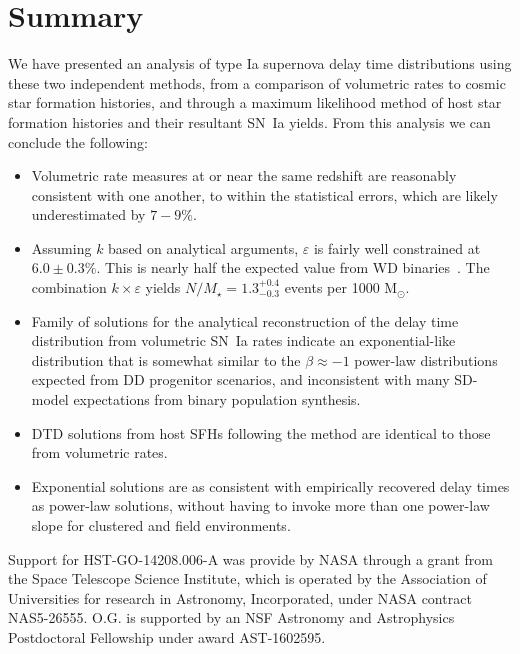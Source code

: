 \documentclass[apj, linenumbers]{aastex62}
\begin{document}
\section{Summary}
We have presented an analysis of type Ia supernova delay time distributions using these two independent methods, from a comparison of volumetric  rates to cosmic star formation histories, and through a maximum likelihood method of host star formation histories and their resultant SN~Ia yields. From this analysis we can conclude the following:
\begin{itemize}
	\item Volumetric rate measures at or near the same redshift are reasonably consistent with one another, to within the statistical errors, which are likely underestimated by $7-9\%$.
	\item  Assuming $k$ based on analytical arguments, $\varepsilon$ is fairly well constrained at $6.0\pm0.3\%$. This is nearly half the expected value from WD binaries~\citep{Maoz:2017zl}. The combination $k\times\varepsilon$ yields $N/M_\star=1.3^{+0.4}_{-0.3}$ events per 1000 M$_{\odot}$.
	\item Family of solutions for the analytical reconstruction of the delay time distribution from volumetric SN~Ia rates indicate an exponential-like distribution that is somewhat similar to the $\beta\approx-1$ power-law distributions expected from DD progenitor scenarios, and inconsistent with many SD-model expectations from binary population synthesis. 
	\item DTD solutions from host SFHs following the \cite{Maoz:2011} method are identical to those from volumetric rates. 
	\item Exponential solutions are as consistent with empirically recovered delay times as power-law solutions, without having to invoke more than one power-law slope for clustered and field environments.
\end{itemize}

\acknowledgments Support for HST-GO-14208.006-A was provide by NASA through a grant from the Space Telescope Science Institute, which is operated by the Association of Universities for research in Astronomy, Incorporated, under NASA contract NAS5-26555. O.G. is supported by an NSF Astronomy and Astrophysics Postdoctoral Fellowship under award AST-1602595.
\end{document}
